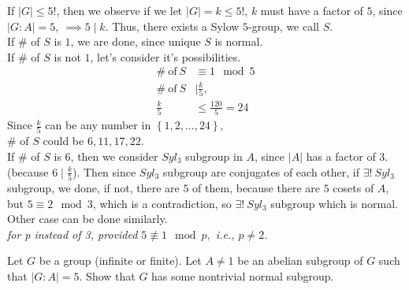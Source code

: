 \documentclass{article}
\begin{document}
\begin{homeworkProblem}
    If $\lvert G \rvert \leq 5!$, then we observe if we let 
    $\lvert G \rvert = k \leq 5!$, $k$ must have a factor of $5$,
    since $\lvert G:A \rvert = 5, \ \implies 5 \mid k$.
    Thus, there exists a Sylow $5$-group, we call $S$.\\
    If \# of $S$ is $1$, we are done, since unique $S$ is normal.\\
    If \# of $S$ is not $1$, let's consider it's possibilities.\\
    \begin{align}
        \# \ \text{of} \ S &\equiv 1 \mod 5\\
        \# \ \text{of} \ S &\mid \frac{ k }{ 5 },\\
        \frac{ k }{ 5 } &\leq \frac{ 120 }{ 5 } = 24
    \end{align}
    Since $\frac{ k }{ 5 }$ can be any number in $\left\{ 1, 2, \ldots, 24 \right\}$,\\
    \# of $S$ could be $6, 11, 17, 22$.\\

    If \# of $S$ is $6$, then we consider $Syl_3$ subgroup in $A$,
    since $\lvert A \rvert$ has a factor of $3$. 
    (because $6 \mid \frac{ k }{ 5 }$). 
    Then since $Syl_3$ subgroup are conjugates of each other, 
    if $\exists ! \ Syl_3$ subgroup, we done, if not, there are 
    $5$ of them, because there are $5$ cosets of $A$,
    but $5 \equiv 2 \mod 3$, 
    which is a contradiction, so $\exists ! \ Syl_3$ 
    subgroup which is normal. 
    Other case can be done similarly.\\
    \textit{for p instead of 3, provided $5 \not\equiv 1 \mod p,$
    i.e., $p \neq 2$.}\\
    



    

    
\end{homeworkProblem}

\pagebreak

\begin{homeworkProblem}
    Let $G$ be a group (infinite or finite). Let $A \neq 1$ be an abelian subgroup of $G$
    such that $\lvert G:A \rvert = 5$. 
    Show that $G$ has some nontrivial normal subgroup.
    
\end{homeworkProblem}
\end{document}
